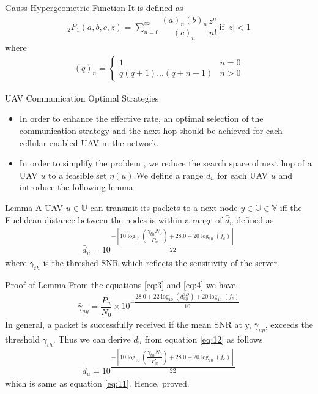 \documentclass{beamer}
\begin{document}
\begin{frame}{}
 \begin{block}{Gauss Hypergeometric Function}
 It is defined as 
 \begin{align}
 {}_{2}F_{1}(a,b,c,z) = \sum_{n=0}^{\infty}\dfrac{(a)_{n}(b)_{n}}{(c)_{n}}\dfrac{z^n}{n!} \ \text{if}\ \vert{z}\vert < 1\nonumber
 \end{align}
 where 
 \begin{align}
(q)_{n}  = 
\begin{cases}
1 & n=0
\\
q(q+1)...(q+n-1) & n > 0
\end{cases} \nonumber
\end{align}
 \end{block}   
\end{frame}

\begin{frame}{UAV Communication Optimal Strategies}
 \begin{itemize}
     \item In order to enhance the effective rate, an optimal selection of the communication strategy and the next hop should be achieved for each cellular-enabled UAV in the network.
     \item In order to simplify the problem , we reduce the search space of next hop of a UAV $u$ to a feasible set $\eta(u)$.We define a range $\bar{d}_{u}$ for each UAV $u$ and introduce the following lemma
 \end{itemize} 
 \begin{block}{Lemma}
 A UAV $u \in \mathbb{U}$ can transmit its packets to a next node $y \in \mathbb{U} \in \mathbb{V}$ iff the Euclidean distance between the nodes is within a range of $\bar{d}_{u}$ defined as
 \begin{align}
 \bar{d}_{u} = 10^{\dfrac{-[10\log_{10}(\dfrac{\gamma_{th}N_{0}}{P_{u}}) + 28.0 + 20\log_{10}(f_{c})]}{22}}\label{eq:11}
 \end{align}
 where $\gamma_{th}$ is the threshed SNR which reflects the sensitivity of the server.
 \end{block}
\end{frame}

\begin{frame}{}
\begin{block}{Proof of Lemma}
From the equations \eqref{eq:3} and \eqref{eq:4} we have
\begin{align}
\bar{\gamma}_{uy} = \dfrac{P_{u}}{N_{0}} \times 10^{-\dfrac{28.0 + 22\log_{10}(d^{3D}_{uy}) + 20\log_{10}(f_{c})}{10}}\label{eq:12}
\end{align}
In general, a packet is successfully received if the mean SNR at y, $\bar{\gamma}_{uy}$, exceeds the threshold $\gamma_{th}$. Thus we can derive $\bar{d}_{u}$ from equation \eqref{eq:12} as follows
\begin{align}
 \bar{d}_{u} = 10^{\dfrac{-[10\log_{10}(\dfrac{\gamma_{th}N_{0}}{P_{u}}) + 28.0 + 20\log_{10}(f_{c})]}{22}}\nonumber
 \end{align}
  which is same as equation \eqref{eq:11}. Hence, proved.
\end{block}    
\end{frame}
\end{document}
